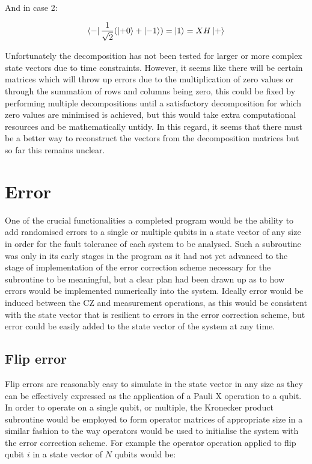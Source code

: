 And in case 2:

\begin{equation}
\label{eq:m_outcome_2}
\bra{-} \frac{1}{\sqrt{2}} (\ket{+ 0} + \ket{- 1}) = \ket{1} = XH \ket{+}
\end{equation}

Unfortunately the decomposition has not been tested for larger or more complex state vectors due to time constraints. However, it seems like there will be certain matrices which will throw up errors due to the multiplication of zero values or through the summation of rows and columns being zero, this could be fixed by performing multiple decompositions until a satisfactory decomposition for which zero values are minimised is achieved, but this would take extra computational resources and be mathematically untidy. In this regard, it seems that there must be a better way to reconstruct the vectors from the decomposition matrices but so far this remains unclear.



\section{Error}

One of the crucial functionalities a completed program would be the ability to add randomised errors to a single or multiple qubits in a state vector of any size in order for the fault tolerance of each system to be analysed. Such a subroutine was only in its early stages in the program as it had not yet advanced to the stage of implementation of the error correction scheme necessary for the subroutine to be meaningful, but a clear plan had been drawn up as to how errors would be implemented numerically into the system. Ideally error would be induced between the CZ and measurement operations, as this would be consistent with the state vector that is resilient to errors in the error correction scheme, but error could be easily added to the state vector of the system at any time.


\subsection{Flip error}

Flip errors are reasonably easy to simulate in the state vector in any size as they can be effectively expressed as the application of a Pauli X operation to a qubit. In order to operate on a single qubit, or multiple, the Kronecker product subroutine would be employed to form operator matrices of appropriate size in a similar fashion to the way operators would be used to initialise the system with the error correction scheme. For example the operator operation applied to flip qubit $i$ in a state vector of $N$ qubits would be:

